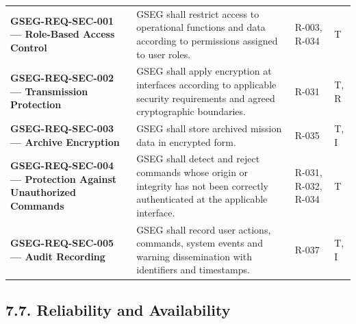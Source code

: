 \begingroup{}
\begin{longtable}{|P{0.27}|P{0.46}|P{0.16}|P{0.11}|}
\hline{}
 &  &  & \\ \hline
\endhead
\hline\endlastfoot
\textbf{GSEG-REQ-SEC-001 — Role-Based Access Control} & GSEG shall restrict access to operational functions and data according to permissions assigned to user roles. & R-003, R-034 & T\\ \hline
\textbf{GSEG-REQ-SEC-002 — Transmission Protection} & GSEG shall apply encryption at interfaces according to applicable security requirements and agreed cryptographic boundaries. & R-031 & T, R\\ \hline
\textbf{GSEG-REQ-SEC-003 — Archive Encryption} & GSEG shall store archived mission data in encrypted form. & R-035 & T, I\\ \hline
\textbf{GSEG-REQ-SEC-004 — Protection Against Unauthorized Commands} & GSEG shall detect and reject commands whose origin or integrity has not been correctly authenticated at the applicable interface. & R-031, R-032, R-034 & T\\ \hline
\textbf{GSEG-REQ-SEC-005 — Audit Recording} & GSEG shall record user actions, commands, system events and warning dissemination with identifiers and timestamps. & R-037 & T, I\\*
\end{longtable}
\endgroup

\subsection{7.7. Reliability and Availability}\label{reliability-and-availability}

